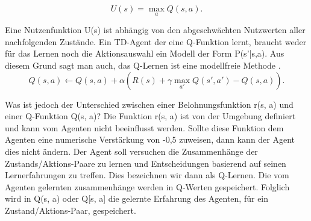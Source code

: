 \begin{equation}
\label{eq:Nutzenwerte und Q-Werte}
U(s) = \max_a Q(s,a).
\end{equation}

Eine Nutzenfunktion U(s) ist abhängig von den abgeschwächten Nutzwerten aller nachfolgenden Zustände. Ein TD-Agent der eine Q-Funktion lernt, braucht weder für das Lernen noch die Aktionsauswahl ein Modell der Form P(s'|s,a). Aus diesem Grund sagt man auch, das Q-Lernen ist eine modellfreie Methode \cite[974]{Russell}. \\

\begin{equation}
Q(s,a) \leftarrow Q(s,a) + \alpha(R(s) + \gamma \max_{a'} Q(s',a') - Q(s,a)).
\end{equation}

Was ist jedoch der Unterschied zwischen einer Belohnungsfunktion r(s, a) und einer Q-Funktion Q(s, a)? Die Funktion r(s, a) ist von der Umgebung definiert und kann vom Agenten nicht beeinflusst werden. Sollte diese Funktion dem Agenten eine numerische Verstärkung von -0,5 zuweisen, dann kann der Agent dies nicht ändern. Der Agent soll versuchen die Zusammenhänge der Zustands/Aktions-Paare zu lernen und Entscheidungen basierend auf seinen Lernerfahrungen zu treffen. Dies bezeichnen wir dann als Q-Lernen. Die vom Agenten gelernten zusammenhänge werden in Q-Werten gespeichert. Folglich wird in Q(s, a) oder Q[s, a] die gelernte Erfahrung des Agenten, für ein Zustand/Aktions-Paar, gespeichert. \\
